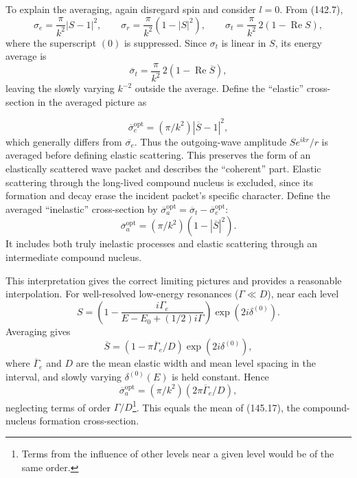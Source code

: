 To explain the averaging, again disregard spin and consider $l=0$. From
(142.7),
\begin{equation}
 \sigma_e=\frac\pi{k^2}|S-1|^2,\qquad
 \sigma_r=\frac\pi{k^2}(1-|S|^2),\qquad
 \sigma_t=\frac\pi{k^2}\,2(1-\operatorname{Re}S),
 \tag{145.19}
\end{equation}
where the superscript $(0)$ is suppressed. Since $\sigma_t$ is linear in $S$,
its energy average is
\begin{equation}
 \overline{\sigma}_t=\frac\pi{k^2}\,2(1-\operatorname{Re}\overline S),
 \tag{145.20}
\end{equation}
leaving the slowly varying $k^{-2}$ outside the average. Define the
``elastic'' cross-section in the averaged picture as

\begin{equation}
 \overline{\sigma}_e^{\mathrm{opt}}=(\pi/k^2)|\overline S-1|^2,
 \tag{145.21}
\end{equation}
which generally differs from $\overline{\sigma_e}$. Thus the outgoing-wave
amplitude $Se^{ikr}/r$ is averaged before defining elastic scattering. This
preserves the form of an elastically scattered wave packet and describes the
``coherent'' part. Elastic scattering through the long-lived compound nucleus
is excluded, since its formation and decay erase the incident packet's
specific character. Define the averaged ``inelastic'' cross-section by
$\overline{\sigma}_a^{\mathrm{opt}}
=\overline{\sigma}_t-\overline{\sigma}_e^{\mathrm{opt}}$:
\begin{equation}
 \overline{\sigma}_a^{\mathrm{opt}}=(\pi/k^2)(1-|\overline S|^2).
 \tag{145.22}
\end{equation}
It includes both truly inelastic processes and elastic scattering through an
intermediate compound nucleus.

This interpretation gives the correct limiting pictures and provides a
reasonable interpolation. For well-resolved low-energy resonances
($\Gamma\ll D$), near each level
\[
 S=\left(1-\frac{i\Gamma_e}{E-E_0+(1/2)i\Gamma}\right)
 \exp(2i\delta^{(0)}).
\]
Averaging gives
\begin{equation}
 \overline S=(1-\pi\overline\Gamma_e/D)\exp(2i\delta^{(0)}),
 \tag{145.23}
\end{equation}
where $\overline\Gamma_e$ and $D$ are the mean elastic width and mean level
spacing in the interval, and slowly varying $\delta^{(0)}(E)$ is held
constant. Hence
\begin{equation}
 \overline{\sigma}_a^{\mathrm{opt}}=(\pi/k^2)(2\pi\overline\Gamma_e/D),
 \tag{145.24}
\end{equation}
neglecting terms of order $\Gamma/D$\footnote{Terms from the influence of
other levels near a given level would be of the same order.}. This equals the
mean of (145.17), the compound-nucleus formation cross-section.

